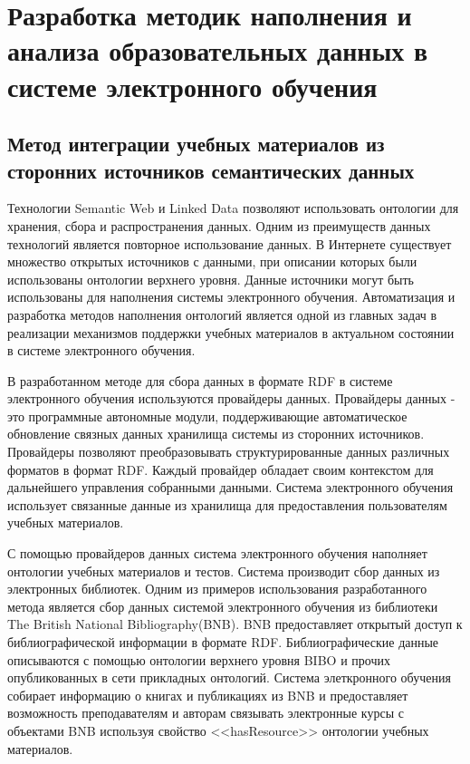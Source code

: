 \chapter{Разработка методик наполнения и анализа образовательных данных в системе электронного обучения} \label{chapt3}


\section{Метод интеграции учебных материалов из сторонних источников семантических данных} 
\label{sect3_1}

Технологии Semantic Web и Linked Data позволяют использовать онтологии для хранения, сбора и распространения данных. Одним из преимуществ данных технологий является повторное использование данных. В Интернете существует множество открытых источников с данными, при описании которых были использованы онтологии верхнего уровня. Данные источники могут быть использованы для наполнения системы электронного обучения. Автоматизация и разработка методов наполнения онтологий является одной из главных задач в реализации механизмов поддержки учебных материалов в актуальном состоянии в системе электронного обучения.

В разработанном методе для сбора данных в формате RDF в системе электронного обучения используются провайдеры данных. Провайдеры данных - это программные автономные модули, поддерживающие  автоматическое обновление связных данных хранилища системы из сторонних источников. Провайдеры позволяют преобразовывать структурированные данных различных форматов в формат RDF. Каждый провайдер обладает своим контекстом для дальнейшего управления собранными данными. Система электронного обучения использует связанные данные из хранилища для предоставления пользователям учебных материалов.

С помощью провайдеров данных система электронного обучения  наполняет онтологии учебных материалов и тестов. Система производит сбор данных из электронных библиотек. Одним из примеров использования разработанного метода является сбор данных системой электронного обучения из библиотеки The British National Bibliography(BNB). BNB предоставляет открытый доступ к библиографической информации в формате RDF. Библиографические данные описываются с помощью онтологии верхнего уровня BIBO и прочих опубликованных в сети прикладных онтологий. Система элеткронного обучения собирает информацию о книгах и публикациях из BNB и предоставляет возможность преподавателям и авторам  связывать электронные курсы с объектами BNB используя свойство <<hasResource>> онтологии учебных материалов.

